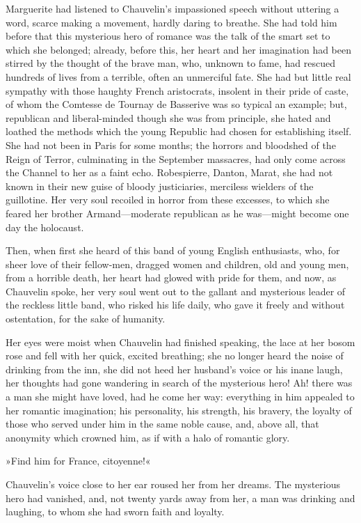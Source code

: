 Marguerite had listened to Chauvelin's impassioned  speech without uttering a word, scarce making a movement, hard\-ly daring to breathe. She had told him before that this mysterious hero of romance was the talk of the smart set to which she belonged; already, before this, her heart and her imagination had been stirred by the thought of the brave man, who, unknown to fame, had rescued hundreds of lives from a terrible, often an unmerciful fate. She had but little real sympathy with those haughty French aristocrats, insolent in their pride of caste, of whom the Comtesse de Tournay de Basserive was so typical an example; but, republican and liberal-minded though she was from principle, she hated and loathed the methods which the young Republic had chosen for establishing itself. She had not been in Paris for some months; the horrors and bloodshed of the Reign of Terror, culminating in the September massacres, had only come across the Channel to her as a faint echo. Robespierre, Danton, Marat, she had not known in their new guise of bloody justiciaries, merciless wielders of the guillotine. Her very soul recoiled in horror from these excesses, to which she feared her brother Armand\allowbreak---\allowbreak moderate republican as he was\allowbreak---\allowbreak might become one day the holocaust.

Then, when first she heard of this band of young English enthusiasts, who, for sheer love of their fellow-men, dragged women and children, old and young men, from a horrible death, her heart had glowed with pride for them, and now, as Chauvelin spoke, her very soul went out to the gallant and mysterious leader of the reckless little band, who risked his life daily, who gave it freely and without ostentation, for the sake of humanity.

Her eyes were moist when Chauvelin had finished speaking, the lace at her bosom rose and fell with her quick, excited breathing; she no longer heard the noise of drinking from the inn, she did not heed her husband's voice or his inane laugh, her thoughts had gone wandering in search of the mysterious hero! Ah! there was a man she might have loved, had he come her way: everything in him appealed to her romantic imagination; his personality, his strength, his bravery, the loyalty of those who served under him in the same noble cause, and, above all, that anonymity which crowned him, as if with a halo of romantic glory.

»Find him for France, citoyenne!«

Chauvelin's voice close to her ear roused her from her dreams. The mysterious hero had vanished, and, not twenty yards away from her, a man was drinking and laughing, to whom she had sworn faith and loyalty.

